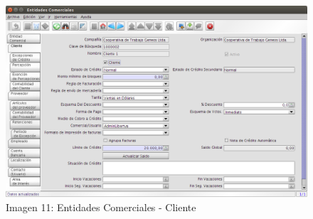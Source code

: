 \documentclass[letterpaper,10pt,spanish]{sphinxmanual}
\begin{document}
\begin{figure}[htbp]
\centering
\capstart

\includegraphics{ly_cli_cli.png}
\caption{Imagen 11: Entidades Comerciales - Cliente}\end{figure}
\end{document}
